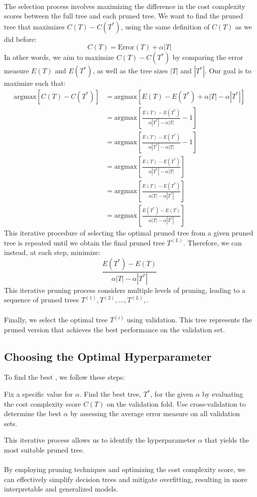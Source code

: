 \documentclass[11pt,a4paper]{report}
\begin{document}
\paragraph{}The selection process involves maximizing the difference in the cost complexity scores between the full tree and each pruned tree. We want to find the pruned tree that maximizes $C(T)-C(T^*)$, using the same definition of $C(T)$ as we did before:
$$C(T)=\textrm{Error}(T)+\alpha|T|$$
In other words, we aim to maximize $C(T)-C(T^*)$ by comparing the error measure $E(T)$ and $E(T^*)$, as well as the tree sizes $|T|$ and $|T^*|$. Our goal is to maximize  such that:
\begin{align*}
\textrm{argmax}\left[C(T)-C(T^*)\right] 
& = \textrm{argmax}\left[E(T)-E(T^*)+\alpha|T|-\alpha|T^*|\right]\\
& = \textrm{argmax}\left[\frac{E(T)-E(T^*)}{\alpha|T^*|-\alpha|T|}-1\right]\\
& = \textrm{argmax}\left[\frac{E(T)-E(T^*)}{\alpha|T^*|-\alpha|T|}-1\right]\\
& = \textrm{argmax}\left[\frac{E(T)-E(T^*)}{\alpha|T^*|-\alpha|T|}\right]\\
& = \textrm{argmax}\left[\frac{E(T)-E(T^*)}{\alpha|T|-\alpha|T^*|}\right]\\
& = \textrm{argmax}\left[\frac{E(T^*)-E(T)}{\alpha|T|-\alpha|T^*|}\right]
\end{align*}
This iterative procedure of selecting the optimal pruned tree from a given pruned tree is repeated until we obtain the final pruned tree $T^{(L)}$. Therefore, we can instead, at each step, minimize:
$$\frac{E(T^*)-E(T)}{\alpha|T|-\alpha|T^*|}$$
This iterative pruning process considers multiple levels of pruning, leading to a sequence of pruned trees $T^{(1)},T^{(2)},\dots,T^{(L)},$.
\paragraph{}Finally, we select the optimal tree $T^{(i)}$ using validation. This tree represents the pruned version that achieves the best performance on the validation set.
\subsection{Choosing the Optimal Hyperparameter}
To find the best , we follow these steps:
\begin{algorithm}[H]
\begin{algorithmic}[1]
   \State Fix a specific value for $\alpha$.
   \State Find the best tree, $T^*$, for the given $\alpha$ by evaluating the cost complexity score $C(T)$ on the validation fold.
	\State Use cross-validation to determine the best $\alpha$ by assessing the average error measure on all validation sets.
\end{algorithmic}
\end{algorithm}
This iterative process allows us to identify the hyperparameter $\alpha$ that yields the most suitable pruned tree.
\paragraph{}By employing pruning techniques and optimizing the cost complexity score, we can effectively simplify decision trees and mitigate overfitting, resulting in more interpretable and generalized models.
\end{document}
